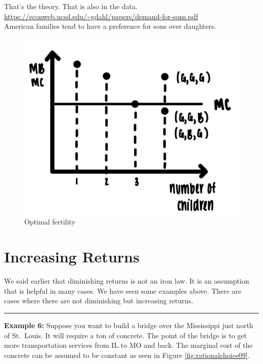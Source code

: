 \documentclass[
]{book}
\begin{document}
That's the theory. That is also in the data. \url{https://econweb.ucsd.edu/~gdahl/papers/demand-for-sons.pdf}\\
American families tend to have a preference for sons over daughters.

\begin{figure}

{\centering \includegraphics[width=0.5\linewidth]{img/rationalchoice/fig8} 

}

\caption{Optimal fertility}\label{fig:rationalchoice08}
\end{figure}

\hypertarget{increasing-returns}{%
\section{Increasing Returns}\label{increasing-returns}}

We said earlier that diminishing returns is not an iron law. It is an assumption that is helpful in many cases. We have seen some examples above. There are cases where there are not diminishing but increasing returns.

\begin{center}\rule{0.5\linewidth}{0.5pt}\end{center}

\textbf{Example 6:} Suppose you want to build a bridge over the Mississippi just north of St.~Louis. It will require a ton of concrete. The point of the bridge is to get more transportation services from IL to MO and back. The marginal cost of the concrete can be assumed to be constant as seen in Figure \ref{fig:rationalchoice09}.
\end{document}
